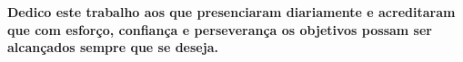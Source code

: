 \begin{dedicatoria}
   \vspace*{\fill}
   \centering
   \noindent
	\textbf{Dedico este trabalho aos que presenciaram diariamente e acreditaram que com esforço, confiança e perseverança os objetivos possam ser alcançados sempre que se deseja. }

   \textit{} \vspace*{\fill}
\end{dedicatoria}
